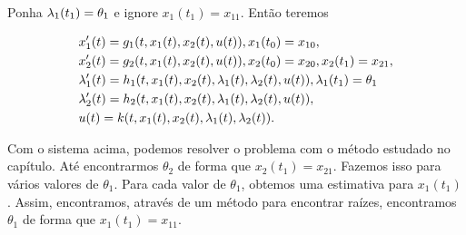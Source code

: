 Ponha $\lambda_1(t_1) = \theta_1$ e ignore $x_1(t_1) = x_{11}$. Então teremos 

\begin{align*}
    &x_1 '(t) = g_1(t, x_1(t), x_2(t), u(t)), x_1(t_0) = x_{10}, \\
    &x_2 '(t) = g_2(t, x_1(t), x_2(t), u(t)), x_2(t_0) = x_{20}, x_2(t_1) = x_{21}, \\
    &\lambda_1 '(t) = h_1(t, x_1(t), x_2(t), \lambda_1(t), \lambda_2(t), u(t)), \lambda_1(t_1) = \theta_1 \\
    &\lambda_2 '(t) = h_2(t, x_1(t), x_2(t), \lambda_1(t), \lambda_2(t), u(t)), \\
    &u(t) = k(t, x_1(t), x_2(t), \lambda_1(t), \lambda_2(t)).
\end{align*}

Com o sistema acima, podemos resolver o problema com o método estudado no
capítulo. Até encontrarmos $\theta_2$ de forma que $x_2(t_1) = x_{21}$.
Fazemos isso para vários valores de $\theta_1$. Para cada valor de $\theta_1$,
obtemos uma estimativa para $x_1(t_1)$. Assim, encontramos, através de um
método para encontrar raízes, encontramos $\theta_1$ de forma que $x_1(t_1) =
x_{11}$. 